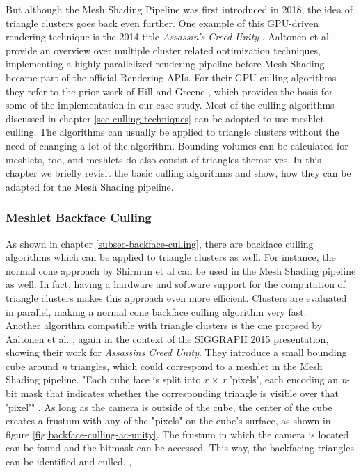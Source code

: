 \noindent
But although the Mesh Shading Pipeline was first introduced in 2018, the idea of triangle clusters goes back even further.
One example of this \ac{GPU}-driven rendering technique is the 2014 title \emph{Assassin's Creed Unity} \cite{Ubisoft2014}.
Aaltonen et al. \cite{Aaltonen2015} provide an overview over multiple cluster related optimization techniques, implementing 
a highly parallelized rendering pipeline before Mesh Shading became part of the official Rendering \ac{API}s.
For their \ac{GPU} culling algorithms they refer to the prior work of Hill \cite{Hill11} and Greene \cite{Greene93}, which 
provides the basis for some of the implementation in our case study. Most of the culling algorithms discussed in chapter 
\ref{sec-culling-techniques} can be adopted to use meshlet culling. The algorithms can usually be applied to triangle clusters 
without the need of changing a lot of the algorithm. Bounding volumes can be calculated for meshlets, too, and meshlets do also 
consist of triangles themselves. In this chapter we briefly revisit the basic culling algorithms and show, how they can be 
adapted for the Mesh Shading pipeline.


\subsubsection*{Meshlet Backface Culling} \label{subsubsec-meshlet-backface-culling}

As shown in chapter \ref{subsec-backface-culling}, there are backface culling algorithms which can be applied to 
triangle clusters as well. For instance, the normal cone approach by Shirmun et al \cite{Shirmun1993} can be used 
in the Mesh Shading pipeline as well. In fact, having a hardware and software support for the computation of triangle 
clusters makes this approach even more efficient. Clusters are evaluated in parallel, making a normal cone backface 
culling algorithm very fast. \\

\noindent
Another algorithm compatible with triangle clusters is the one propsed by Aaltonen et al. \cite{Aaltonen2015}, again 
in the context of the SIGGRAPH 2015 presentation, showing their work for \emph{Assassins Creed Unity}. They introduce 
a small bounding cube around \emph{n} triangles, which could correspond to a meshlet in the Mesh Shading pipeline. 
"Each cube face is split into \emph{r} \begin{math}\times\end{math} \emph{r} 'pixels', each encoding an \emph{n}-
bit mask that indicates whether the corresponding triangle is visible over that 'pixel'" \cite{AkenineMoeller2018}.
As long as the camera is outside of the cube, the center of the cube creates a frustum with any of the "pixels" on 
the cube's surface, as shown in figure \ref{fig:backface-culling-ac-unity}. The frustum in which the camera is 
located can be found and the bitmask can be accessed. This way, the backfacing triangles can be identified and 
culled. \cite{Aaltonen2015}, \cite{AkenineMoeller2018}

